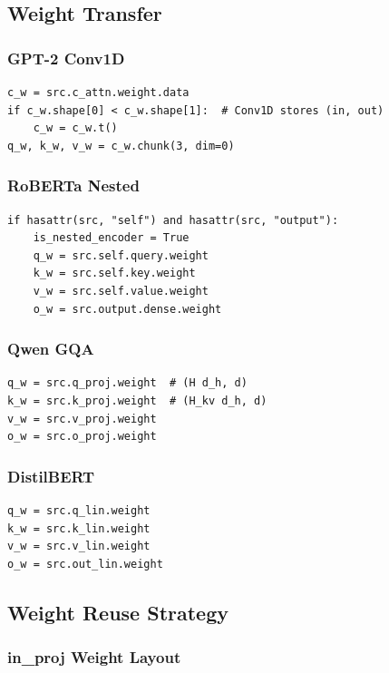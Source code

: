 \subsection{Weight Transfer}

\subsubsection{GPT-2 Conv1D}

\begin{lstlisting}
c_w = src.c_attn.weight.data
if c_w.shape[0] < c_w.shape[1]:  # Conv1D stores (in, out)
    c_w = c_w.t()
q_w, k_w, v_w = c_w.chunk(3, dim=0)
\end{lstlisting}

\subsubsection{RoBERTa Nested}

\begin{lstlisting}
if hasattr(src, "self") and hasattr(src, "output"):
    is_nested_encoder = True
    q_w = src.self.query.weight
    k_w = src.self.key.weight
    v_w = src.self.value.weight
    o_w = src.output.dense.weight
\end{lstlisting}

\subsubsection{Qwen GQA}

\begin{lstlisting}
q_w = src.q_proj.weight  # (H d_h, d)
k_w = src.k_proj.weight  # (H_kv d_h, d)
v_w = src.v_proj.weight
o_w = src.o_proj.weight
\end{lstlisting}

\subsubsection{DistilBERT}

\begin{lstlisting}
q_w = src.q_lin.weight
k_w = src.k_lin.weight
v_w = src.v_lin.weight
o_w = src.out_lin.weight
\end{lstlisting}

\subsection{Weight Reuse Strategy}

\subsubsection{in\_proj Weight Layout}

